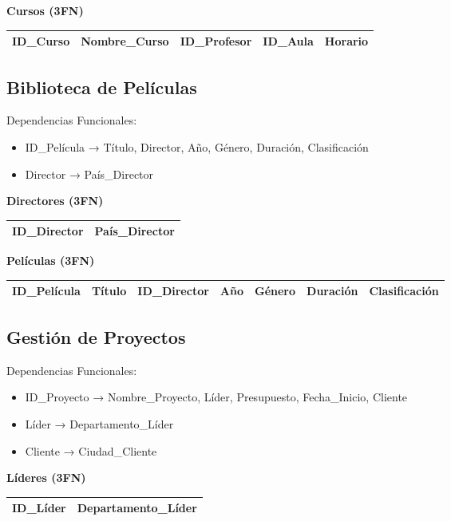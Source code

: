 \documentclass[12pt]{article}
\begin{document}
\textbf{Cursos (3FN)}
\begin{center}
\begin{tabular}{|l|l|l|l|l|}
\hline
ID\_Curso & Nombre\_Curso & ID\_Profesor & ID\_Aula & Horario \\
\hline
\end{tabular}
\end{center}

\subsection{Biblioteca de Películas}

Dependencias Funcionales:
\begin{itemize}
    \item ID\_Película → Título, Director, Año, Género, Duración, Clasificación
    \item Director → País\_Director
\end{itemize}

\textbf{Directores (3FN)}
\begin{center}
\begin{tabular}{|l|l|}
\hline
ID\_Director & País\_Director \\
\hline
\end{tabular}
\end{center}

\textbf{Películas (3FN)}
\begin{center}
\begin{tabular}{|l|l|l|l|l|l|l|}
\hline
ID\_Película & Título & ID\_Director & Año & Género & Duración & Clasificación \\
\hline
\end{tabular}
\end{center}

\subsection{Gestión de Proyectos}

Dependencias Funcionales:
\begin{itemize}
    \item ID\_Proyecto → Nombre\_Proyecto, Líder, Presupuesto, Fecha\_Inicio, Cliente
    \item Líder → Departamento\_Líder
    \item Cliente → Ciudad\_Cliente
\end{itemize}

\textbf{Líderes (3FN)}
\begin{center}
\begin{tabular}{|l|l|}
\hline
ID\_Líder & Departamento\_Líder \\
\hline
\end{tabular}
\end{center}
\end{document}
